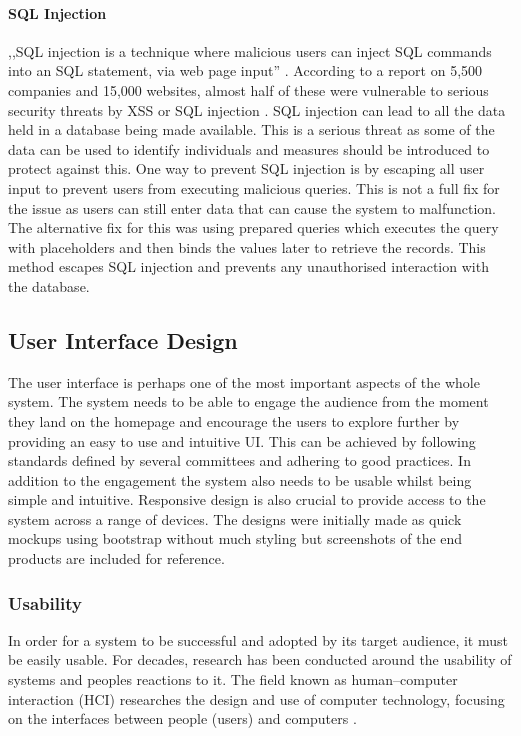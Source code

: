 \paragraph{SQL Injection}
,,SQL injection is a technique where malicious users can inject SQL commands into an SQL statement, via web page input'' \cite{W3Schools:SQL_Injection}. According to a report on 5,500 companies and 15,000 websites, almost half of these were vulnerable to serious security threats by XSS or SQL injection \cite{FirstPost:Vulnerabilities}. SQL injection can lead to all the data held in a database being made available. This is a serious threat as some of the data can be used to identify individuals and measures should be introduced to protect against this. One way to prevent SQL injection is by escaping all user input to prevent users from executing malicious queries. This is not a full fix for the issue as users can still enter data that can cause the system to malfunction. The alternative fix for this was using prepared queries which executes the query with placeholders and then binds the values later to retrieve the records. This method escapes SQL injection and prevents any unauthorised interaction with the database.


\subsection{User Interface Design}
The user interface is perhaps one of the most important aspects of the whole system. The system needs to be able to engage the audience from the moment they land on the homepage and encourage the users to explore further by providing an easy to use and intuitive UI. This can be achieved by following standards defined by several committees and adhering to good practices. In addition to the engagement the system also needs to be usable whilst being simple and intuitive. Responsive design is also crucial to provide access to the system across a range of devices. The designs were initially made as quick mockups using bootstrap without much styling but screenshots of the end products are included for reference.

\subsubsection{Usability}
In order for a system to be successful and adopted by its target audience, it must be easily usable. For decades, research has been conducted around the usability of systems and peoples reactions to it. The field known as human–computer interaction (HCI) researches the design and use of computer technology, focusing on the interfaces between people (users) and computers \cite{Wiki:HCI}.

